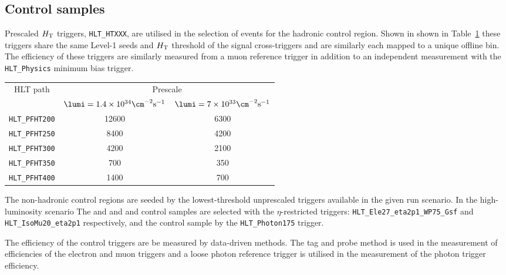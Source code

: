 \subsection{Control samples\label{sec:control_samples}}
Prescaled $\mbox{$H_\text{T}$}$ triggers, \verb!HLT_HTXXX!, are utilised in the selection of events for the hadronic control region. Shown in shown in Table~\ref{tab:2015_Hadronic_Control_Triggers} these triggers share the same Level-1 seeds and $\mbox{$H_\text{T}$}$ threshold of the signal cross-triggers and are similarly each mapped to a unique offline bin. The efficiency of these triggers are similarly measured from a muon reference trigger in addition to an independent measurement with the \verb!HLT_Physics! minimum bias trigger.


\begin{table}[h!]
\footnotesize
\centering
\begin{tabular}{c|cc} 
\hline
\hline
HLT path & \multicolumn{2}{c}{Prescale} \\
         & $\lumi=1.4\times10^{34}\cm^{-2}{\rm s}^{-1}$  & $\lumi=7\times10^{33}\cm^{-2}{\rm s}^{-1}$     \\
\hline
\texttt{HLT\_PFHT200} & 12600 & 6300 \\
\texttt{HLT\_PFHT250} & 8400  & 4200 \\
\texttt{HLT\_PFHT300} & 4200  & 2100 \\
\texttt{HLT\_PFHT350} & 700   & 350  \\
\texttt{HLT\_PFHT400} & 1400  & 700  \\
\hline
\hline

\end{tabular}
\label{tab:2015_Hadronic_Control_Triggers}
\end{table}


The non-hadronic control regions are seeded by the lowest-threshold unprescaled 
triggers available in the given run scenario. In the high-luminosity scenario The \ej 
and \eej and \mj and \mmj control samples are selected with the $\eta$-restricted 
triggers: \verb!HLT_Ele27_eta2p1_WP75_Gsf! and \verb!HLT_IsoMu20_eta2p1! respectively,
and the \gj control sample by the \verb!HLT_Photon175! trigger. 

The efficiency of the control triggers are be measured by data-driven methods. The tag 
and probe method is used in the measurement of efficiencies of the electron and muon triggers 
and a loose photon reference trigger is utilised in the measurement of the photon trigger
efficiency.








